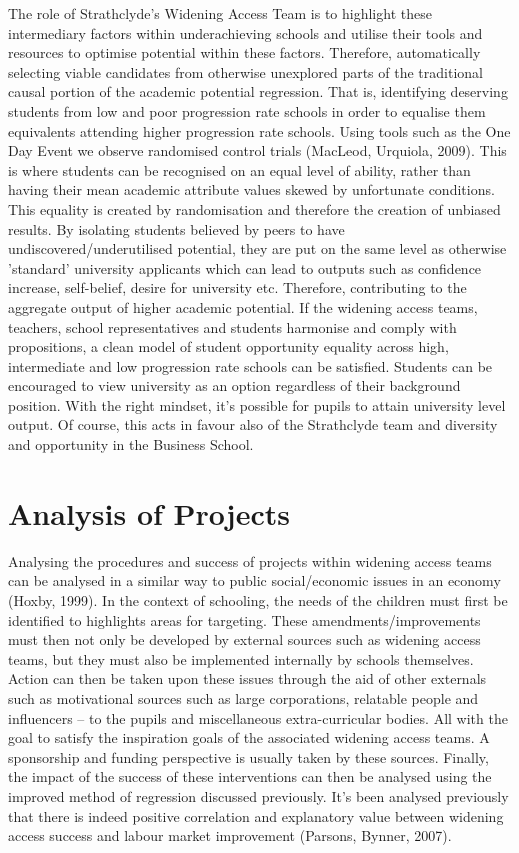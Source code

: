 \documentclass[11pt, english]{article}
\begin{document}
	The role of Strathclyde's Widening Access Team is to highlight these intermediary factors within underachieving schools and utilise their tools and resources to optimise potential within these factors. Therefore, automatically selecting viable candidates from otherwise unexplored parts of the traditional causal portion of the academic potential regression. That is, identifying deserving students from low and poor progression rate schools in order to equalise them equivalents attending higher progression rate schools. Using tools such as the One Day Event we observe randomised control trials (MacLeod, Urquiola, 2009). This is where students can be recognised on an equal level of ability, rather than having their mean academic attribute values skewed by unfortunate conditions. This equality is created by randomisation and therefore the creation of unbiased results. By isolating students believed by peers to have undiscovered/underutilised potential, they are put on the same level as otherwise 'standard' university applicants which can lead to outputs such as confidence increase, self-belief, desire for university etc. Therefore, contributing to the aggregate output of higher academic potential. If the widening access teams, teachers, school representatives and students harmonise and comply with propositions, a clean model of student opportunity equality across high, intermediate and low progression rate schools can be satisfied. Students can be encouraged to view university as an option regardless of their background position. With the right mindset, it's possible for pupils to attain university level output. Of course, this acts in favour also of the Strathclyde team and diversity and opportunity in the Business School.

\newpage 

\section{Analysis of Projects}

	Analysing the procedures and success of projects within widening access teams can be analysed in a similar way to public social/economic issues in an economy (Hoxby, 1999). In the context of schooling, the needs of the children must first be identified to highlights areas for targeting. These amendments/improvements must then not only be developed by external sources such as widening access teams, but they must also be implemented internally by schools themselves. Action can then be taken upon these issues through the aid of other externals such as motivational sources such as large corporations, relatable people and influencers – to the pupils and miscellaneous extra-curricular bodies. All with the goal to satisfy the inspiration goals of the associated widening access teams. A sponsorship and funding perspective is usually taken by these sources. Finally, the impact of the success of these interventions can then be analysed using the improved method of regression discussed previously. It's been analysed previously that there is indeed positive correlation and explanatory value between widening access success and labour market improvement (Parsons, Bynner, 2007).
\end{document}

